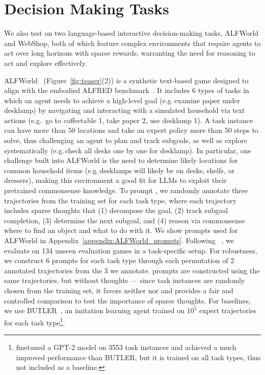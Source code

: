\section{Decision Making Tasks}
\label{decision_making_tasks}

We also test \model{} on two language-based interactive decision-making tasks, ALFWorld and WebShop,
both of which feature complex environments that require agents to act over long horizons with sparse rewards, warranting the need for reasoning to act and explore effectively.



ALFWorld~\citep{shridhar2020alfworld} (Figure~\ref{fig:teaser}(2)) is a synthetic text-based game designed to align with the embodied ALFRED benchmark~\citep{shridhar2020alfred}. It includes 6 types of tasks in which an agent needs to achieve a high-level goal (e.g.\,examine paper under desklamp) by navigating and interacting with a simulated household via text actions (e.g.\,
go to coffeetable 1, take paper 2, use desklamp 1).
A task instance can have more than 50 locations and take an expert policy more than 50 steps to solve, thus challenging an agent to plan and track subgoals, as well as explore systematically (e.g.\,check all desks one by one for desklamp). In particular, one challenge built into ALFWorld is the need to determine likely locations for common household items (e.g.\,desklamps will likely be on desks, shelfs, or dressers), making this environment a good fit for LLMs to exploit their pretrained commonsense knowledge.
To prompt \model{}, we randomly annotate three trajectories from the training set for each task type, where each trajectory includes sparse thoughts that (1) decompose the goal, (2) track subgoal completion, (3) determine the next subgoal, and (4) reason via commonsense where to find an object and what to do with it.
We show prompts used for ALFWorld in Appendix~\ref{appendix:ALFWorld_prompts}.
Following ~\citet{shridhar2020alfworld}, we evaluate on 134 unseen evaluation games in a task-specific setup. For robustness, we construct 6 prompts for each task type through each permutation of 2 annotated trajectories from the 3 we annotate. \act{} prompts are constructed using the same trajectories, but without thoughts --- since task instances are randomly chosen from the training set, it favors neither \model{} nor \act{} and provides a fair and controlled comparison to test the importance of sparse thoughts. 
For baselines, we use BUTLER~\citep{shridhar2020alfworld}, an imitation learning agent trained on $10^5$ expert trajectories for each task type\footnote{\citet{micheli2021language} finetuned a GPT-2 model on 3553 task instances and achieved a much improved performance than BUTLER, but it is trained on all task types, thus not included as a baseline.}. 














